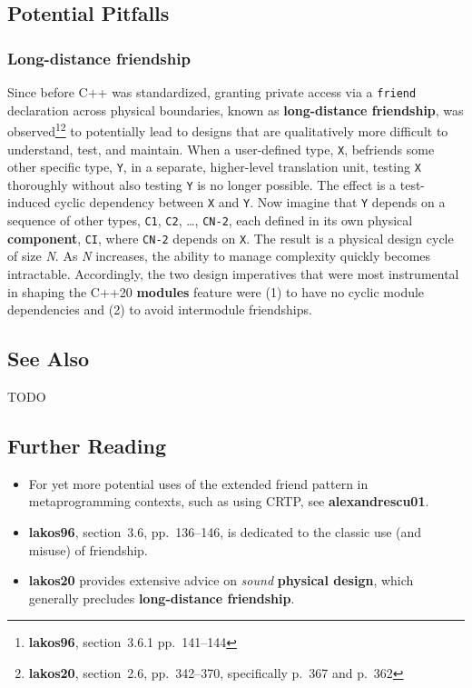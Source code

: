 \subsection[Potential Pitfalls]{Potential Pitfalls}\label{potential-pitfalls-extendedfriend}

\subsubsection[Long-distance friendship]{Long-distance friendship}\label{long-distance-friendship}

Since before C++ was standardized, granting private access via a
\texttt{friend} declaration across physical boundaries, known as
\textbf{long-distance friendship}, was
observed{\cprotect\footnote{\textbf{lakos96}, section~3.6.1
  pp.~141--144}}{\cprotect\footnote{\textbf{lakos20}, section~2.6,
  pp.~342--370, specifically p.~367 and p.~362}} to potentially lead
to designs that are qualitatively more difficult to understand, test,
and maintain. When a user-defined type, \texttt{X}, befriends some other
specific type, \texttt{Y}, in a separate, higher-level translation unit,
testing \texttt{X} thoroughly without also testing \texttt{Y} is no
longer possible. The effect is a test-induced cyclic dependency between
\texttt{X} and \texttt{Y}. Now imagine that \texttt{Y} depends on a
sequence of other types, \texttt{C1}, \texttt{C2}, \ldots,
\texttt{CN-2}, each defined in its own physical \textbf{component},
\texttt{CI}, where \texttt{CN-2} depends on \texttt{X}. The result is a
physical design cycle of size \emph{N}. As \emph{N} increases, the
ability to manage complexity quickly becomes intractable. Accordingly,
the two design imperatives that were most instrumental in shaping the
C++20 \textbf{modules} feature were (1) to have no cyclic module
dependencies and (2) to avoid intermodule friendships.

\subsection[See Also]{See Also}\label{see-also}

TODO

\subsection[Further Reading]{Further Reading}\label{further-reading}

\begin{itemize}
\item{For yet more potential uses of the extended friend pattern in
metaprogramming contexts, such as using CRTP, see
\textbf{alexandrescu01}.}
\item{\textbf{lakos96}, section~3.6, pp.~136--146, is dedicated to the
classic use (and misuse) of friendship.}
\item{\textbf{{lakos20}} provides extensive advice on \emph{sound}
\textbf{physical design}, which generally precludes \textbf{long-distance
friendship}.}
\end{itemize}

